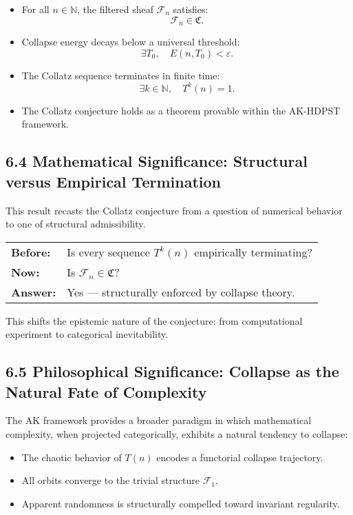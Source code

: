 \documentclass[11pt]{article}
\begin{document}
\begin{itemize}
  \item For all \( n \in \mathbb{N} \), the filtered sheaf \( \mathcal{F}_n \) satisfies:
  \[
  \mathcal{F}_n \in \mathfrak{C}.
  \]
  \item Collapse energy decays below a universal threshold:
  \[
  \exists T_0,\quad E(n,T_0) < \varepsilon.
  \]
  \item The Collatz sequence terminates in finite time:
  \[
  \exists k \in \mathbb{N},\quad T^k(n) = 1.
  \]
  \item The Collatz conjecture holds as a theorem provable within the AK-HDPST framework.
\end{itemize}

\subsection{6.4 Mathematical Significance: Structural versus Empirical Termination}

This result recasts the Collatz conjecture from a question of numerical behavior to one of structural admissibility.

\begin{center}
\begin{tabular}{ll}
\textbf{Before:} & Is every sequence \( T^k(n) \) empirically terminating? \\
\textbf{Now:}    & Is \( \mathcal{F}_n \in \mathfrak{C} \)? \\
\textbf{Answer:} & Yes — structurally enforced by collapse theory.
\end{tabular}
\end{center}

This shifts the epistemic nature of the conjecture: from computational experiment to categorical inevitability.

\subsection{6.5 Philosophical Significance: Collapse as the Natural Fate of Complexity}

The AK framework provides a broader paradigm in which mathematical complexity, when projected categorically, exhibits a natural tendency to collapse:

\begin{itemize}
  \item The chaotic behavior of \( T(n) \) encodes a functorial collapse trajectory.
  \item All orbits converge to the trivial structure \( \mathcal{F}_1 \).
  \item Apparent randomness is structurally compelled toward invariant regularity.
\end{itemize}
\end{document}
